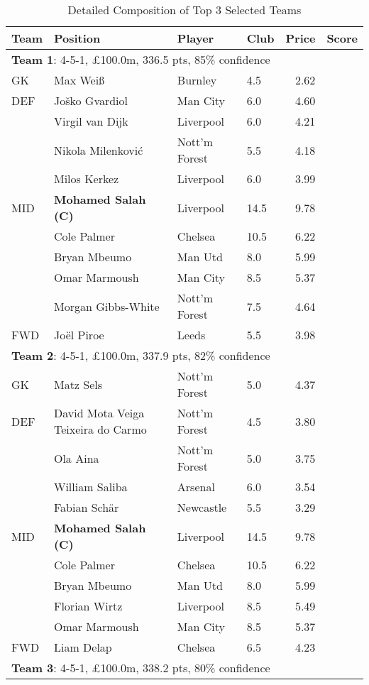 \begin{table*}[h]
\centering
\caption{Detailed Composition of Top 3 Selected Teams}
\small
\begin{tabular}{llllrr}
\toprule
\textbf{Team} & \textbf{Position} & \textbf{Player} & \textbf{Club} & \textbf{Price} & \textbf{Score} \\
\midrule
\multicolumn{6}{l}{\textbf{Team 1}: 4-5-1, £100.0m, 336.5 pts, 85\% confidence} \\
\midrule
GK & Max Weiß & Burnley & 4.5 & 2.62 \\
DEF & Joško Gvardiol & Man City & 6.0 & 4.60 \\
 & Virgil van Dijk & Liverpool & 6.0 & 4.21 \\
 & Nikola Milenković & Nott'm Forest & 5.5 & 4.18 \\
 & Milos Kerkez & Liverpool & 6.0 & 3.99 \\
MID & \textbf{Mohamed Salah (C)} & Liverpool & 14.5 & 9.78 \\
 & Cole Palmer & Chelsea & 10.5 & 6.22 \\
 & Bryan Mbeumo & Man Utd & 8.0 & 5.99 \\
 & Omar Marmoush & Man City & 8.5 & 5.37 \\
 & Morgan Gibbs-White & Nott'm Forest & 7.5 & 4.64 \\
FWD & Joël Piroe & Leeds & 5.5 & 3.98 \\
\midrule
\multicolumn{6}{l}{\textbf{Team 2}: 4-5-1, £100.0m, 337.9 pts, 82\% confidence} \\
\midrule
GK & Matz Sels & Nott'm Forest & 5.0 & 4.37 \\
DEF & David Mota Veiga Teixeira do Carmo & Nott'm Forest & 4.5 & 3.80 \\
 & Ola Aina & Nott'm Forest & 5.0 & 3.75 \\
 & William Saliba & Arsenal & 6.0 & 3.54 \\
 & Fabian Schär & Newcastle & 5.5 & 3.29 \\
MID & \textbf{Mohamed Salah (C)} & Liverpool & 14.5 & 9.78 \\
 & Cole Palmer & Chelsea & 10.5 & 6.22 \\
 & Bryan Mbeumo & Man Utd & 8.0 & 5.99 \\
 & Florian Wirtz & Liverpool & 8.5 & 5.49 \\
 & Omar Marmoush & Man City & 8.5 & 5.37 \\
FWD & Liam Delap & Chelsea & 6.5 & 4.23 \\
\midrule
\multicolumn{6}{l}{\textbf{Team 3}: 4-5-1, £100.0m, 338.2 pts, 80\% confidence} \\

\end{tabular}
\end{table*}
